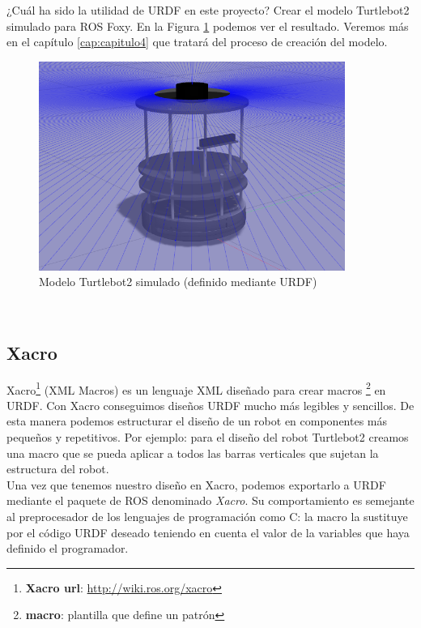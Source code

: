 ¿Cuál ha sido la utilidad de URDF en este proyecto? Crear el modelo Turtlebot2 simulado para ROS Foxy. En la Figura \ref{fig:modelo_turtlebot2_simulado} podemos ver el resultado. Veremos más en el capítulo \ref{cap:capitulo4} que tratará del proceso de creación del modelo.
\begin{figure} [H]
  \begin{center}
    \includegraphics[width=10cm]{imagenes/cap3/turtlebot2-sim.png}
  \end{center}
  \caption{Modelo Turtlebot2 simulado (definido mediante URDF)}
  \label{fig:modelo_turtlebot2_simulado}
\end{figure}\




\subsection{Xacro}
\label{subsec:xacro}

Xacro\footnote{\textbf{Xacro url}: \url{http://wiki.ros.org/xacro}} (XML Macros) es un lenguaje XML diseñado para crear macros \footnote{\textbf{macro}: plantilla que define un patrón} en URDF. Con Xacro conseguimos diseños URDF mucho más legibles y sencillos. De esta manera podemos estructurar el diseño de un robot en componentes más pequeños y repetitivos. Por ejemplo: para el diseño del robot Turtlebot2 creamos una macro que se pueda aplicar a todos las barras verticales que sujetan la estructura del robot.\\

Una vez que tenemos nuestro diseño en Xacro, podemos exportarlo a URDF mediante el paquete de ROS denominado \textit{Xacro}. Su comportamiento es semejante al preprocesador de los lenguajes de programación como C: la macro la sustituye por el código URDF deseado teniendo en cuenta el valor de la variables que haya definido el programador.\\

